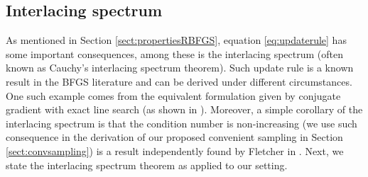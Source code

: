 \documentclass[12pt,conference,compsocconf]{IEEEtran}
\begin{document}
\subsection{Interlacing spectrum}\label{sect:interlacing}
As mentioned in Section \ref{sect:propertiesRBFGS}, equation \ref{eq:updaterule} has some important consequences, among these is the interlacing spectrum (often known as Cauchy's interlacing spectrum theorem). Such update rule is a known result in the BFGS literature and can be derived under different circumstances. One such example comes from the equivalent formulation given by conjugate gradient with exact line search (as shown in \cite{Nazareth}). Moreover, a simple corollary of the interlacing spectrum is that the condition number is non-increasing (we use such consequence in the derivation of our proposed convenient sampling in Section \ref{sect:convsampling}) is a result independently found by Fletcher in \cite{Fletcher}.
Next, we state the interlacing spectrum theorem as applied to our setting.
\end{document}
